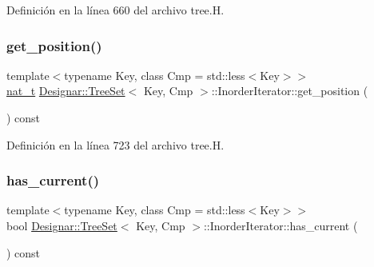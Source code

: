 Definición en la línea 660 del archivo tree.\+H.

\mbox{\label{class_designar_1_1_tree_set_1_1_inorder_iterator_a32fceb8d4318ee6c11c07c1b02b93635}} 
\subsubsection{\texorpdfstring{get\+\_\+position()}{get\_position()}}
{\footnotesize\ttfamily template$<$typename Key, class Cmp = std\+::less$<$\+Key$>$$>$ \\
\hyperlink{namespace_designar_aa72662848b9f4815e7bf31a7cf3e33d1}{nat\+\_\+t} \hyperlink{class_designar_1_1_tree_set}{Designar\+::\+Tree\+Set}$<$ Key, Cmp $>$\+::Inorder\+Iterator\+::get\+\_\+position (\begin{DoxyParamCaption}{ }\end{DoxyParamCaption}) const\hspace{0.3cm}{\ttfamily [inline]}}



Definición en la línea 723 del archivo tree.\+H.

\mbox{\label{class_designar_1_1_tree_set_1_1_inorder_iterator_ae83dae23b6d48b2ccec38c7e22d01fd0}} 
\subsubsection{\texorpdfstring{has\+\_\+current()}{has\_current()}}
{\footnotesize\ttfamily template$<$typename Key, class Cmp = std\+::less$<$\+Key$>$$>$ \\
bool \hyperlink{class_designar_1_1_tree_set}{Designar\+::\+Tree\+Set}$<$ Key, Cmp $>$\+::Inorder\+Iterator\+::has\+\_\+current (\begin{DoxyParamCaption}{ }\end{DoxyParamCaption}) const\hspace{0.3cm}{\ttfamily [inline]}}




